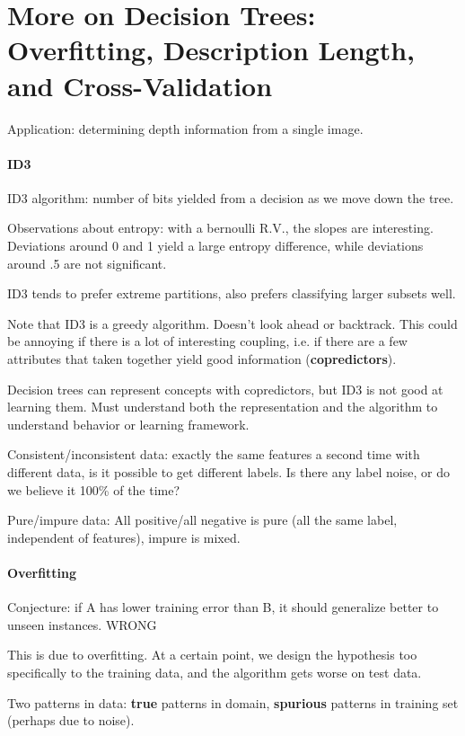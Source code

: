 \section{More on Decision Trees: Overfitting, Description Length, and Cross-Validation}

Application: determining depth information from a single image.

\paragraph{ID3} ID3 algorithm: number of bits yielded from a decision as we move down the tree.

Observations about entropy: with a bernoulli R.V., the slopes are interesting. Deviations around 0 and 1 yield a large entropy difference, while deviations around .5 are not significant.

ID3 tends to prefer extreme partitions, also prefers classifying larger subsets well.

Note that ID3 is a greedy algorithm. Doesn't look ahead or backtrack. This could be annoying if there is a lot of interesting coupling, i.e. if there are a few attributes that taken together yield good information (\textbf{copredictors}).

Decision trees can represent concepts with copredictors, but ID3 is not good at learning them. Must understand both the representation and the algorithm to understand behavior or learning framework.

Consistent/inconsistent data: exactly the same features a second time with different data, is it possible to get different labels. Is there any label noise, or do we believe it 100\% of the time?

Pure/impure data: All positive/all negative is pure (all the same label, independent of features), impure is mixed.

\paragraph{Overfitting} Conjecture: if A has lower training error than B, it should generalize better to unseen instances. WRONG

This is due to overfitting. At a certain point, we design the hypothesis too specifically to the training data, and the algorithm gets worse on test data.

Two patterns in data: \textbf{true} patterns in domain, \textbf{spurious} patterns in training set (perhaps due to noise).

